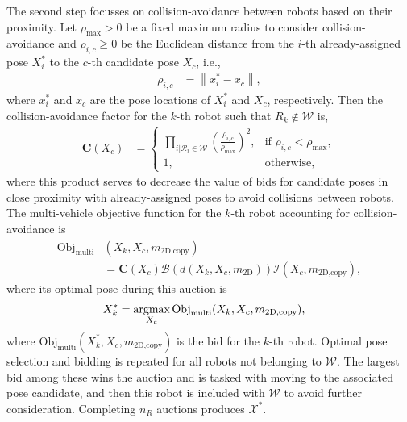 \documentclass[smallextended]{svjour3}       %
\newcommand{\norm}[1]{\ensuremath{\left\| #1 \right\|}}
\newcommand{\argmax}{\operatornamewithlimits{argmax}}
\begin{document}
The second step focusses on collision-avoidance between robots based on their proximity. Let $\rho_\text{max}>0$ be a fixed maximum radius to consider collision-avoidance and $\rho_{i,c}\geq0$ be the Euclidean distance from the $i$-th already-assigned pose $X^*_i$ to the $c$-th candidate pose $X_c$, i.e.,
\begin{align}
\rho_{i,c}&=\norm{x^*_i-x_c},
\end{align}
where $x^*_i$ and $x_c$ are the pose locations of $X^*_i$ and $X_c$, respectively. Then the collision-avoidance factor for the $k$-th robot such that $R_k\notin\mathcal W$ is,
\begin{align}
\label{eqn:CollisionAvoidanceAmongRobots}
\mathbf C(X_c)&=
\begin{cases}
    \prod_{i|\mathcal{R}_i\in\mathcal W} \left(\frac{\rho_{i,c}}{\rho_\text{max}}\right)^2,		& \text{if }\rho_{i,c}<\rho_\text{max},\\
    1,              				& \text{otherwise},
\end{cases}
\end{align}
where this product serves to decrease the value of bids for candidate poses in close proximity with already-assigned poses to avoid collisions between robots. The multi-vehicle objective function for the $k$-th robot accounting for collision-avoidance is
\begin{align}
\label{eqn:CandidateBidMulti}
\text{Obj}_\text{multi}&(X_k,X_c,m_\text{2D,copy})
\nonumber\\&=\mathbf C(X_c)\mathcal B(d(X_k,X_c,m_\text{2D}))\mathcal I(X_{c},m_\text{2D,copy}),
\end{align}
where its optimal pose during this auction is
\begin{align}
\label{eqn:OptPoseMulti}
X^*_{k}=\argmax_{X_c}\text{Obj}_\text{multi}&(X_k,X_c,m_\text{2D,copy}),
\end{align}
where $\text{Obj}_\text{multi}(X^*_k,X_c,m_\text{2D,copy})$ is the bid for the $k$-th robot.
Optimal pose selection and bidding is repeated for all robots not belonging to $\mathcal W$. The largest bid among these wins the auction and is tasked with moving to the associated pose candidate, and then this robot is included with $\mathcal W$ to avoid further consideration. Completing $n_R$ auctions produces $\mathcal X^*$.

\end{document}
